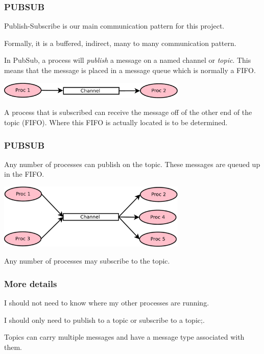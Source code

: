 \documentclass[xcolor=svgnames]{beamer}
\begin{document}

\begin{frame}[fragile]
\frametitle{PUBSUB}

Publish-Subscribe is our main communication pattern for this project.\vfill

Formally, it is a buffered, indirect, many to many communication pattern.\vfill

In PubSub, a process will {\it publish} a message on a named channel or \textit{topic}. This means that the 
message is placed in a message queue which is normally a FIFO. \vfill

\vfill 
\begin{center}
\includegraphics[width=9cm]{./Image3.pdf}
\end{center}
\vfill
A process that is subscribed
can receive the message off of the other end of the topic (FIFO).  Where this FIFO
is actually located is to be determined.
\end{frame}



\begin{frame}[fragile]
\frametitle{PUBSUB}


  Any number of
processes can publish on the topic.   These messages are queued up in the  FIFO.
  
\vfill 
\begin{center}
\includegraphics[width=9cm]{./Image4.pdf}
\end{center}

\vfill

Any number of processes may subscribe to the topic.  
\end{frame}




\begin{frame}[fragile]
\frametitle{More details}

I should not need to know where my other processes are running. 
\vfill

I should only need to publish to a topic or subscribe
to a topic;.

\vfill

Topics can carry multiple messages and have a message type associated with them.
 
 
 
\end{frame}
\end{document}

